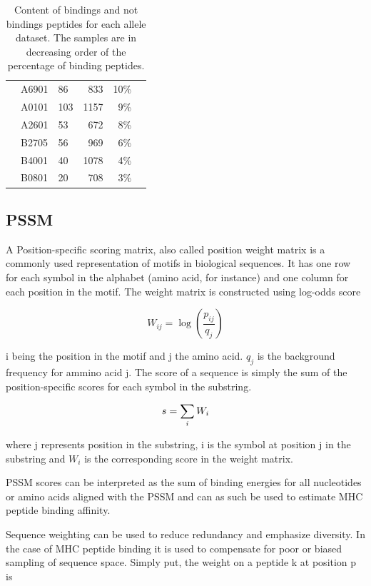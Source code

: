 \begin{table}[ht]
\begin{center}
\begin{tabular}{rllrrr}
 & A6901	&	86	&	833	&	10\%	\\
 & A0101	&	103	&	1157	&	9\%	\\
 & A2601	&	53	&	672	&	8\%	\\
 & B2705	&	56	&	969	&	6\%	\\
 & B4001	&	40	&	1078	&	4\%	\\
 & B0801	&	20	&	708	&	3\%	\\
\hline
\end{tabular}
\caption{Content of bindings and not bindings peptides for each allele dataset. The samples are in decreasing order of the percentage of binding peptides.}\label{ftable}
\end{center}
\end{table}



\subsection*{PSSM}
A Position-specific scoring matrix, also called position weight matrix is a commonly used representation of motifs in biological sequences. 
It has one row for each symbol in the alphabet (amino acid, for instance) and one column for each position in the motif.
The weight matrix is constructed using log-odds score

\begin{equation}
W_{ij} = \log{ (\frac{p_{ij}}{q_j}) }
\end{equation}

i being the position in the motif and j the amino acid. $q_j$ is the background frequency for ammino acid j. 
The score of a sequence is simply the sum of the position-specific scores for each symbol in the substring.

\begin{equation}
s = \sum_{i}{W_{i}} \\
\end{equation}

where j represents position in the substring, i is the symbol at position j in the substring and $W_{i}$ is the corresponding score in the weight matrix.

PSSM scores can be interpreted as the sum of binding energies for all nucleotides or amino acids aligned with the PSSM and can as such be used to estimate MHC peptide binding affinity.

Sequence weighting can be used to reduce redundancy and emphasize diversity. In the case of MHC peptide binding it is used to compensate for poor or biased sampling of sequence space.
Simply put, the weight on a peptide k at position p is

